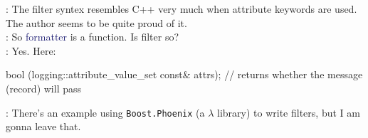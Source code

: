 \documentclass[dvipsnames]{article}
\newcommand{\mycola}{MidnightBlue}
\newcommand{\mycolb}{Mahogany}
\newcommand{\cola}[1]{\textcolor{\mycola}{#1}}
\newcommand{\colb}[1]{\textcolor{\mycolb}{#1}}
\begin{document}
\begin{tcolorbox}
   : The filter syntex resembles C++ very much when attribute
  keywords are used. The author seems to be quite proud of it.\\
   : So \cola{formatter} is a function. Is \colb{filter} so?\\
   : Yes. Here:
\end{tcolorbox}

\begin{simplec}
  bool (logging::attribute_value_set const& attrs); // returns whether the message (record) will pass
\end{simplec}

 : There's an example using \texttt{Boost.Phoenix} (a $\lambda$
library) to write filters, but I am gonna leave that.
\end{document}
